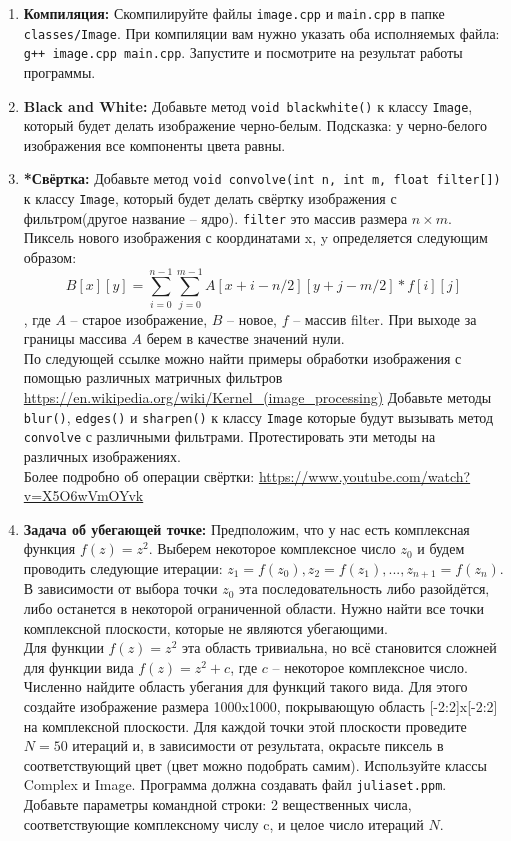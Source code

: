 \documentclass{article}
\begin{document}
\begin{enumerate}
\item \textbf{Компиляция:} Скомпилируйте файлы \texttt{image.cpp} и \texttt{main.cpp} в папке \texttt{classes/Image}. При компиляции вам нужно указать оба исполняемых файла: \texttt{g++ image.cpp main.cpp}. Запустите и посмотрите на результат работы программы.
\item \textbf{Black and White:} Добавьте метод \texttt{void blackwhite()} к классу \texttt{Image}, который будет делать изображение черно-белым. Подсказка: у черно-белого изображения все компоненты цвета равны.
\item \textbf{*Свёртка:} Добавьте метод \texttt{void convolve(int n, int m, float filter[])} к классу \texttt{Image}, который будет делать свёртку изображения с фильтром(другое название -- ядро). \texttt{filter} это массив размера $n \times m$. Пиксель нового изображения с координатами x, y определяется следующим образом: 
$$B[x][y] = \sum_{i=0}^{n-1} \sum_{j=0}^{m-1} A[x+i-n/2][y+j-m/2]*f[i][j]$$
, где $A$ -- старое изображение, $B$ -- новое, $f$ -- массив filter. При выходе за границы массива $A$ берем в качестве значений нули. \\
По следующей ссылке можно найти примеры обработки изображения с помощью различных матричных фильтров
\href{https://en.wikipedia.org/wiki/Kernel_(image_processing)}{https://en.wikipedia.org/wiki/Kernel\_(image\_processing)}
Добавьте методы \texttt{blur()}, \texttt{edges()} и \texttt{sharpen()} к классу \texttt{Image} которые будут вызывать метод \texttt{convolve} с различными фильтрами. Протестировать эти методы на различных изображениях.\\
Более подробно об операции свёртки:
\href{https://www.youtube.com/watch?v=X5O6wVmOYvk}{https://www.youtube.com/watch?v=X5O6wVmOYvk}


\item \textbf{Задача об убегающей точке:} Предположим, что у нас есть комплексная функция $f(z) = z^2$. Выберем некоторое комплексное число $z_0$ и будем проводить следующие итерации: $z_1 = f(z_0), z_2 = f(z_1), ..., z_{n+1} = f(z_n)$. В зависимости от выбора точки $z_0$ эта последовательность либо разойдётся, либо останется в некоторой ограниченной области. Нужно найти все точки комплексной плоскости, которые не являются убегающими. \\
Для функции $f(z) = z^2$ эта область тривиальна, но всё становится сложней для функции вида $f(z) = z^2 + c$, где $c$ -- некоторое комплексное число. Численно найдите область убегания для функций такого вида. Для этого создайте изображение размера 1000x1000, покрывающую область [-2:2]x[-2:2] на комплексной плоскости. Для каждой точки этой плоскости проведите $N=50$ итераций и, в зависимости от результата, окрасьте пиксель в соответствующий цвет (цвет можно подобрать самим). Используйте классы Complex и Image. Программа должна создавать файл \texttt{juliaset.ppm}.\\
Добавьте параметры командной строки: 2 вещественных числа, соответствующие комплексному числу c, и целое число итераций $N$. 


\end{enumerate}
\end{document}
